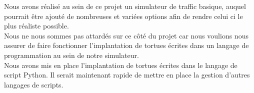 \documentclass[a4paper,12pt]{report}
\begin{document}
Nous avons réalisé au sein de ce projet un simulateur de traffic basique, auquel pourrait être ajouté de nombreuses et variées options afin de rendre celui ci le plus réaliste possible. \\

Nous ne nous sommes pas attardés sur ce côté du projet car nous voulions nous assurer de faire fonctionner l'implantation de tortues écrites dans un langage de programmation au sein de notre simulateur. \\

Nous avons mis en place l'implantation de tortues écrites dans le langage de script Python. Il serait maintenant rapide de mettre en place la gestion d'autres langages de scripts.\\
\end{document}
